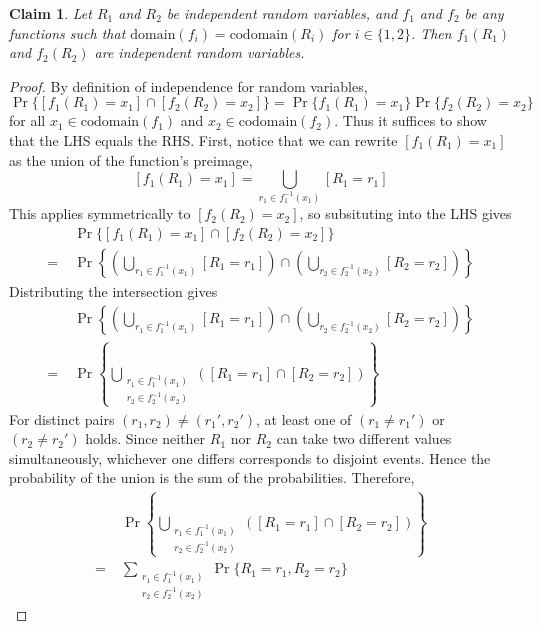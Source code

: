 \documentclass{article}
\newtheorem*{claim}{Claim}
\begin{document}
\begin{claim}
    Let $R_1$ and $R_2$ be independent random variables, and $f_1$ and $f_2$ be any functions such that 
    $\mathrm{domain}(f_i) = \mathrm{codomain}(R_i)$ for $i \in \{1, 2\}$. Then $f_1(R_1)$ and $f_2(R_2)$ 
    are independent random variables.
\end{claim}

\begin{proof}
    By definition of independence for random variables, 
    \[
    \Pr\{[f_1(R_1) = x_1] \cap [f_2(R_2) = x_2]\} = \Pr\{f_1(R_1) = x_1\}\Pr\{f_2(R_2) = x_2\}
    \]
    for all $x_1 \in \mathrm{codomain}(f_1)$ and $x_2 \in \mathrm{codomain}(f_2)$. Thus it suffices to 
    show that the LHS equals the RHS. First, notice that we can rewrite $[f_1(R_1) = x_1]$ as the union of 
    the function's preimage,
    \[
    [f_1(R_1) = x_1] = \bigcup_{r_1 \in f_1^{-1}(x_1)}[R_1 = r_1]
    \]
    This applies symmetrically to $[f_2(R_2) = x_2]$, so subsituting into the LHS gives 
    \[
    \begin{aligned}
        &\Pr\{[f_1(R_1) = x_1] \cap [f_2(R_2) = x_2]\} \\[6pt]
        =\;&\Pr\left\{\left(\bigcup_{r_1 \in f_1^{-1}(x_1)}[R_1 = r_1]\right) 
        \cap \left(\bigcup_{r_2 \in f_2^{-1}(x_2)}[R_2 = r_2]\right)\right\}
    \end{aligned}
    \]
    Distributing the intersection gives 
    \[
    \begin{aligned}
        &\Pr\left\{\left(\bigcup_{r_1 \in f_1^{-1}(x_1)}[R_1 = r_1]\right) 
        \cap \left(\bigcup_{r_2 \in f_2^{-1}(x_2)}[R_2 = r_2]\right)\right\} \\[6pt]
        =\;&\Pr\left\{\bigcup_{\substack{r_1 \in f_1^{-1}(x_1)\\r_2 \in f_2^{-1}(x_2)}}
        ([R_1 = r_1] \cap [R_2 = r_2])\right\}
    \end{aligned}
    \]
    For distinct pairs $(r_1, r_2) \neq (r_1', r_2')$, at least one of $(r_1 \neq r_1')$ or $(r_2 \neq r_2')$ 
    holds. Since neither $R_1$ nor $R_2$ can take two different values simultaneously, whichever one differs 
    corresponds to disjoint events. Hence the probability of the union is the sum of the probabilities. Therefore,
    \[
    \begin{aligned}
        &\Pr\left\{\bigcup_{\substack{r_1 \in f_1^{-1}(x_1)\\r_2 \in f_2^{-1}(x_2)}}
        ([R_1 = r_1] \cap [R_2 = r_2])\right\} \\[6pt]
        =\;&\sum_{\substack{r_1 \in f_1^{-1}(x_1)\\r_2 \in f_2^{-1}(x_2)}}\Pr\{R_1 = r_1, R_2 = r_2\}

\end{aligned}\]
\end{proof}
\end{document}
